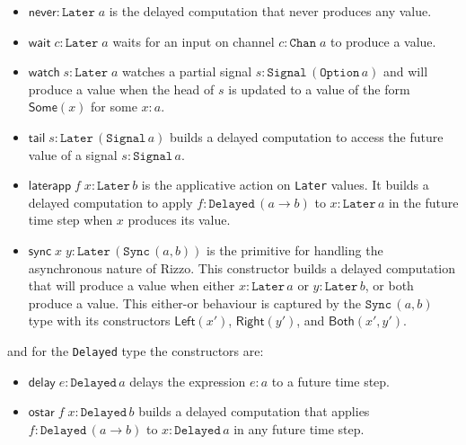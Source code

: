 \begin{itemize}
    \item $\mathsf{never} : \texttt{Later}\;a$ is the delayed computation that never produces any value.
    \item $\mathsf{wait}\;c : \texttt{Later}\;a$ waits for an input on channel $c : \texttt{Chan}\;a$ to produce a value.
    \item $\mathsf{watch}\;s : \texttt{Later}\;a$ watches a partial signal $s : \texttt{Signal}\,(\texttt{Option}\,a)$ and will produce a value when the head of $s$ is updated to a value of the form $\mathsf{Some}(x)$ for some $x: a$. 
    \item $\mathsf{tail}\;s : \texttt{Later}\,(\texttt{Signal}\,a)$ builds a delayed computation to access the future value of a signal $s : \texttt{Signal}\,a$.
    \item $\mathsf{laterapp} \; f \; x : \texttt{Later}\,b$ is the applicative action on \texttt{Later} values. It builds a delayed computation to apply $f : \texttt{Delayed}\,(a \to b)$ to $x : \texttt{Later}\,a$ in the future time step when $x$ produces its value.
    \item $\mathsf{sync}\; x \; y : \texttt{Later}\,(\texttt{Sync}\,(a,b))$ is the primitive for handling the asynchronous nature of Rizzo. This constructor builds a delayed computation that will produce a value when either $x : \texttt{Later}\,a$ or $y : \texttt{Later}\,b$, or both produce a value. This either-or behaviour is captured by the $\texttt{Sync}\,(a,b)$ type with its constructors $\mathsf{Left}(x')$, $\mathsf{Right}(y')$, and $\mathsf{Both}(x',y')$.
\end{itemize}

and for the \texttt{Delayed} type the constructors are:
\begin{itemize}
    \item $\mathsf{delay}\;e : \texttt{Delayed}\,a$ delays the expression $e : a$ to a future time step.
    \item $\mathsf{ostar} \; f \; x : \texttt{Delayed}\,b$ builds a delayed computation that applies $f: \texttt{Delayed}\,(a \to b)$ to $x : \texttt{Delayed}\,a$ in any future time step. 
\end{itemize}


